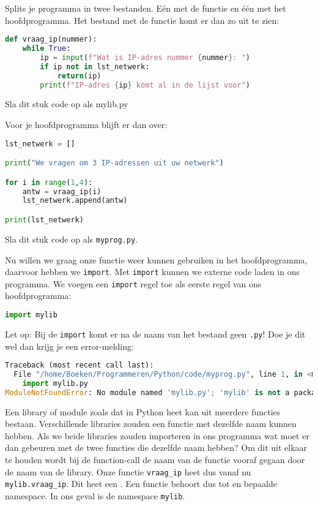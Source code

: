 Splits je programma in twee bestanden. E\'en met de functie en \'e\'en met het hoofdprogramma. Het bestand met de functie komt er dan zo uit te zien:
\begin{lstlisting}[language=python]
def vraag_ip(nummer):
    while True:
        ip = input(f"Wat is IP-adres nummer {nummer}: ")
        if ip not in lst_netwerk:
            return(ip)
        print(f"IP-adres {ip} komt al in de lijst voor")
\end{lstlisting}
Sla dit stuk code op als mylib.py

Voor je hoofdprogramma blijft er dan over:
\begin{lstlisting}[language=python]
lst_netwerk = []

print("We vragen om 3 IP-adressen uit uw netwerk")

for i in range(1,4):
    antw = vraag_ip(i)
    lst_netwerk.append(antw)

print(lst_netwerk)
\end{lstlisting}
Sla dit stuk code op als \texttt{myprog.py}.

Nu willen we graag onze functie weer kunnen gebruiken in het hoofdprogramma, daarvoor hebben we \texttt{import}. Met \texttt{import} kunnen we externe code laden in ons programma. We voegen een \texttt{import} regel toe als eerste regel van ons hoofdprogramma:
\begin{lstlisting}[language=python]
import mylib
\end{lstlisting}
Let op: Bij de \texttt{import} komt er na de naam van het bestand geen \texttt{.py}! Doe je dit wel dan krijg je een error-melding:
\begin{lstlisting}[language=python]
Traceback (most recent call last):
  File "/home/Boeken/Programmeren/Python/code/myprog.py", line 1, in <module>
    import mylib.py
ModuleNotFoundError: No module named 'mylib.py'; 'mylib' is not a package
\end{lstlisting}

Een library of module zoals dat in Python heet kan uit meerdere functies bestaan. Verschillende libraries zouden een functie met dezelfde naam kunnen hebben. Als we beide libraries zouden importeren in ons programma wat moet er dan gebeuren met de twee functies die dezelfde naam hebben? Om dit uit elkaar te houden wordt bij de function-call de naam van de functie vooraf gegaan door de naam van de library. Onze functie \texttt{vraag\_ip} heet dus vanaf nu \texttt{mylib.vraag\_ip}. Dit heet een . Een functie behoort dus tot en bepaalde namespace. In ons geval is de namespace \texttt{mylib}.

